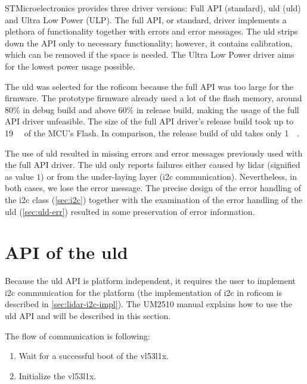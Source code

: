 \documentclass[
  digital,     %
  oneside,     %
  nosansbold,  %
  nocolorbold, %
  nolof,         %
  nolot,         %
]{fithesis4}
\begin{document}
{{{STMicroelectronics provides three driver versions: Full API (standard), \acrlong{uld} (\acrshort{uld}) and Ultra Low Power (ULP). The full API, or standard, driver implements a plethora of functionality together with errors and error messages. The \acrlong{uld} strips down the API only to necessary functionality; however, it contains calibration, which can be removed if the space is needed. The Ultra Low Power driver aims for the lowest power usage possible.

The \acrlong{uld} was selected for the \acrshort{roficom} because the full API was too large for the firmware. The prototype firmware already used a lot of the flash memory, around $80\%$ in debug build and above $60\%$ in release build, making the usage of the full API driver unfeasible. The size of the full API driver's release build took up to \qty{19}{\kilo\byte} of the MCU's Flash. In comparison, the release build of \acrlong{uld} takes only \qty{1}{\kilo\byte}. 

The use of \acrshort{uld} resulted in missing errors and error messages previously used with the full API driver. The \acrshort{uld} only reports failures either caused by lidar (signified as value $1$) or from the under-laying layer (\acrshort{i2c} communication). Nevertheless, in both cases, we lose the error message. The precise design of the error handling of the \acrshort{i2c} class (\autoref{sec:i2c}) together with the examination of the error handling of the \acrshort{uld} (\autoref{sec:uld-err}) resulted in some preservation of error information.

\section[ API of the Ultra Lite Driver ]{ API of the \acrlong{uld} } \label{sec:lidar-api}
Because the \acrshort{uld} API is platform independent, it requires the user to implement \acrshort{i2c} communication for the platform (the implementation of \acrshort{i2c} in \acrshort{roficom} is described in \autoref{sec:lidar-i2c-impl}). The UM2510 \cite{um2510} manual explains how to use the \acrshort{uld} API and will be described in this section.

The flow of communication is following:
\begin{enumerate}
    \item Wait for a successful boot of the \gls{vl53l1x}.
    
    \item Initialize the \gls{vl53l1x}.
    

\end{enumerate}}}}
\end{document}
